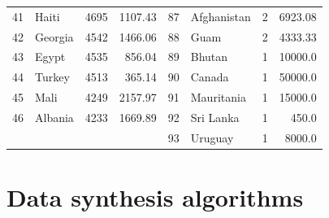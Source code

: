 \begin{longtable}{|c|l|r|r|c|l|r|r|}
	41          & Haiti                 & 4695                               & 1107.43                         & 87          & Afghanistan           & 2                                  & 6923.08                         \\
	42          & Georgia               & 4542                               & 1466.06                         & 88          & Guam                  & 2                                  & 4333.33                         \\
	43          & Egypt                 & 4535                               & 856.04                          & 89          & Bhutan                & 1                                  & 10000.0                         \\
	44          & Turkey                & 4513                               & 365.14                          & 90          & Canada                & 1                                  & 50000.0                         \\
	45          & Mali                  & 4249                               & 2157.97                         & 91          & Mauritania            & 1                                  & 15000.0                         \\
	46          & Albania               & 4233                               & 1669.89                         & 92          & Sri Lanka             & 1                                  & 450.0                           \\
	            &                       &                                    &                                 & 93          & Uruguay               & 1                                  & 8000.0                          \\
\end{longtable}

\chapter{Data synthesis algorithms}

